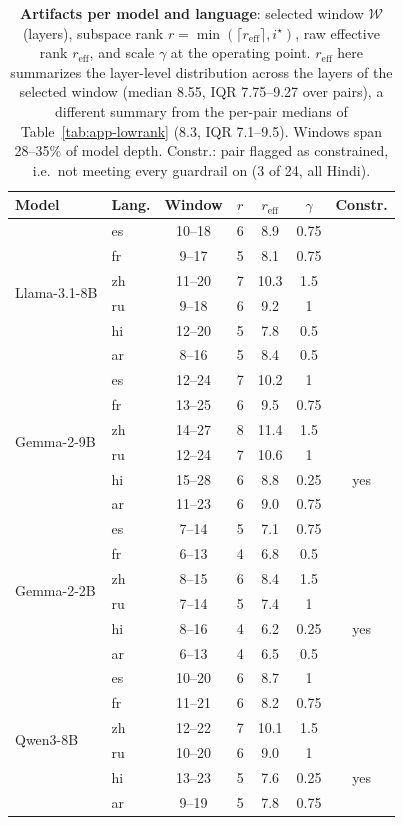 \begin{table}[!htbp]
  \centering
  \footnotesize
  \setlength{\tabcolsep}{3.5pt}
  \begin{tabular}{@{}llccccc@{}}
    \toprule
    \textbf{Model} & \textbf{Lang.} & \textbf{Window} & $r$ & $r_{\mathrm{eff}}$ & $\gamma$ & \textbf{Constr.} \\
    \midrule
    \multirow{6}{*}{Llama-3.1-8B} & es & 10--18 & 6 & 8.9 & 0.75 &  \\
     & fr & 9--17 & 5 & 8.1 & 0.75 &  \\
     & zh & 11--20 & 7 & 10.3 & 1.5 &  \\
     & ru & 9--18 & 6 & 9.2 & 1 &  \\
     & hi & 12--20 & 5 & 7.8 & 0.5 &  \\
     & ar & 8--16 & 5 & 8.4 & 0.5 &  \\
    \midrule
    \multirow{6}{*}{Gemma-2-9B} & es & 12--24 & 7 & 10.2 & 1 &  \\
     & fr & 13--25 & 6 & 9.5 & 0.75 &  \\
     & zh & 14--27 & 8 & 11.4 & 1.5 &  \\
     & ru & 12--24 & 7 & 10.6 & 1 &  \\
     & hi & 15--28 & 6 & 8.8 & 0.25 & yes \\
     & ar & 11--23 & 6 & 9.0 & 0.75 &  \\
    \midrule
    \multirow{6}{*}{Gemma-2-2B} & es & 7--14 & 5 & 7.1 & 0.75 &  \\
     & fr & 6--13 & 4 & 6.8 & 0.5 &  \\
     & zh & 8--15 & 6 & 8.4 & 1.5 &  \\
     & ru & 7--14 & 5 & 7.4 & 1 &  \\
     & hi & 8--16 & 4 & 6.2 & 0.25 & yes \\
     & ar & 6--13 & 4 & 6.5 & 0.5 &  \\
    \midrule
    \multirow{6}{*}{Qwen3-8B} & es & 10--20 & 6 & 8.7 & 1 &  \\
     & fr & 11--21 & 6 & 8.2 & 0.75 &  \\
     & zh & 12--22 & 7 & 10.1 & 1.5 &  \\
     & ru & 10--20 & 6 & 9.0 & 1 &  \\
     & hi & 13--23 & 5 & 7.6 & 0.25 & yes \\
     & ar & 9--19 & 5 & 7.8 & 0.75 &  \\
    \bottomrule
  \end{tabular}
  \caption{\textbf{Artifacts per model and language}: selected window $\mathcal{W}$ (layers), subspace rank $r=\min(\lceil r_{\mathrm{eff}}\rceil,i^\star)$, raw effective rank $r_{\mathrm{eff}}$, and scale $\gamma$ at the operating point. $r_{\mathrm{eff}}$ here summarizes the layer-level distribution across the layers of the selected window (median 8.55, IQR 7.75--9.27 over pairs), a different summary from the per-pair medians of Table~\ref{tab:app-lowrank} (8.3, IQR 7.1--9.5). Windows span 28--35\% of model depth. Constr.: pair flagged as constrained, i.e.\ not meeting every guardrail on \Ddev (3 of 24, all Hindi).}
  \label{tab:app-windows}
\end{table}

